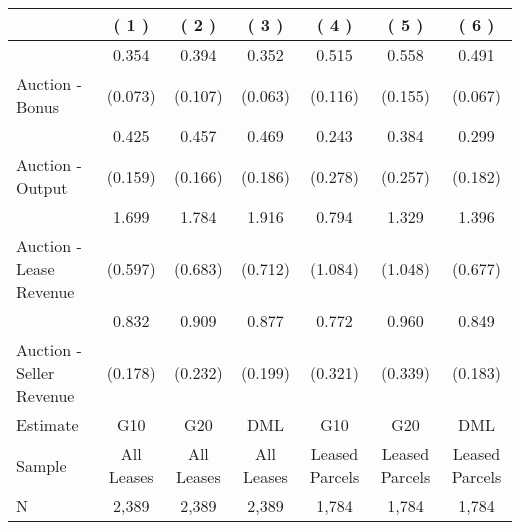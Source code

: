
\begin{tabular}{lcccccc}
\toprule
  & ( 1 ) & ( 2 ) & ( 3 ) & ( 4 ) & ( 5 ) & ( 6 )\\
\midrule
 & 0.354 & 0.394 & 0.352 & 0.515 & 0.558 & 0.491\\

\multirow{-2}{*}{\raggedright\arraybackslash Auction - Bonus} & (0.073) & (0.107) & (0.063) & (0.116) & (0.155) & (0.067)\\

\midrule
 & 0.425 & 0.457 & 0.469 & 0.243 & 0.384 & 0.299\\

\multirow{-2}{*}{\raggedright\arraybackslash Auction - Output} & (0.159) & (0.166) & (0.186) & (0.278) & (0.257) & (0.182)\\

\midrule
 & 1.699 & 1.784 & 1.916 & 0.794 & 1.329 & 1.396\\

\multirow{-2}{*}{\raggedright\arraybackslash Auction - Lease Revenue} & (0.597) & (0.683) & (0.712) & (1.084) & (1.048) & (0.677)\\

\midrule
 & 0.832 & 0.909 & 0.877 & 0.772 & 0.960 & 0.849\\

\multirow{-2}{*}{\raggedright\arraybackslash Auction - Seller Revenue} & (0.178) & (0.232) & (0.199) & (0.321) & (0.339) & (0.183)\\

\midrule
Estimate & G10 & G20 & DML & G10 & G20 & DML\\

Sample & All Leases & All Leases & All Leases & Leased Parcels & Leased Parcels & Leased Parcels\\

N & 2,389 & 2,389 & 2,389 & 1,784 & 1,784 & 1,784\\
\bottomrule
\end{tabular}
